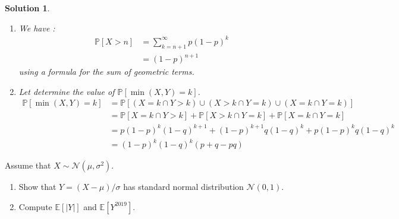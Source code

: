\documentclass{article}
\newcommand{\proba}[1]{\mathbb{P}[#1]}
\newtheorem{solution}{Solution}
\begin{document}
\begin{solution}
  \begin{enumerate}
    \item We have :
          \begin{align*}
            \proba{X > n} & = \sum_{k = n+1}^\infty p (1-p)^k \\
                          & = (1-p)^{n+1}
          \end{align*}
          using a formula for the sum of geometric terms.
    \item Let determine the value of $\proba{\min(X, Y) = k}$.
          \begin{align*}
            \proba{\min(X, Y) = k} & = \proba{(X = k \cap Y > k) \cup (X > k \cap Y = k) \cup (X = k \cap Y = k)}     \\
                                   & = \proba{X = k \cap Y > k} + \proba{X > k \cap Y = k} + \proba{X = k \cap Y = k} \\
                                   & = p (1-p)^k (1-q)^{k+1} + (1-p)^{k+1} q (1-q)^{k} + p (1-p)^k q (1-q)^{k}        \\
                                   & = (1-p)^k (1-q)^k (p + q - pq)
          \end{align*}
  \end{enumerate}
\end{solution}

\begin{Exercise} Assume that $X \sim \mathcal{N}\left(\mu, \sigma^{2}\right)$.
  \begin{enumerate}
    \item Show that $Y=(X-\mu) / \sigma$ has standard normal distribution
          $\mathcal{N}(0,1)$.
    \item Compute $\mathbb{E}[|Y|]$ and $\mathbb{E}\left[Y^{2019}\right]$.
  \end{enumerate}
\end{Exercise}
\end{document}
